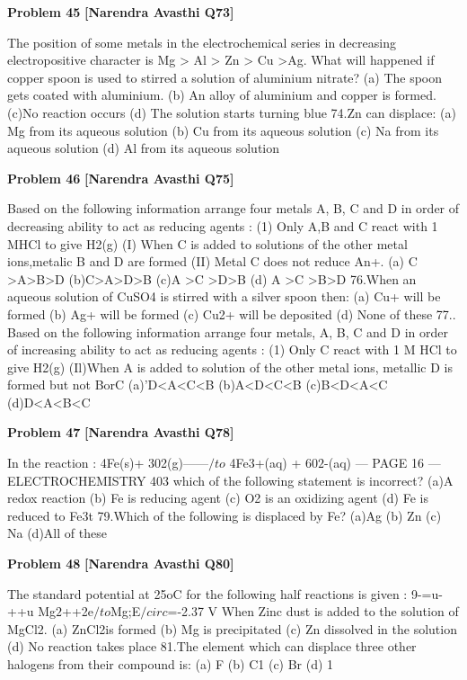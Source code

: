 \begin{problembox}
\textbf{Problem 45} \hfill \textbf{[Narendra Avasthi Q73]}
\label{q:ext-narendra_avasthi_all_questions-45}

The position of some metals in the electrochemical series in decreasing electropositive
character is Mg > Al > Zn > Cu >Ag. What will happened if copper spoon is used to stirred a
solution of aluminium nitrate?
(a) The spoon gets coated with aluminium.
(b) An alloy of aluminium and copper is formed.
(c)No reaction occurs
(d) The solution starts turning blue
74.Zn can displace:
(a) Mg from its aqueous solution
(b) Cu from its aqueous solution
(c) Na from its aqueous solution
(d) Al from its aqueous solution
\end{problembox}

\begin{problembox}
\textbf{Problem 46} \hfill \textbf{[Narendra Avasthi Q75]}
\label{q:ext-narendra_avasthi_all_questions-46}

Based on the following information arrange four metals A, B, C and D in order of decreasing
ability to act as reducing agents :
(1) Only A,B and C react with 1 MHCl to give H2(g)
(I) When C is added to solutions of the other metal ions,metalic B and D are formed
(II) Metal C does not reduce An+.
(a) C >A>B>D
(b)C>A>D>B
(c)A >C >D>B
(d) A >C >B>D
76.When an aqueous solution of CuSO4 is stirred with a silver spoon then:
(a) Cu+ will be formed
(b) Ag+ will be formed
(c) Cu2+ will be deposited
(d) None of these
77.. Based on the following information arrange four metals, A, B, C and D in order of increasing
ability to act as reducing agents :
(1) Only C react with 1 M HCl to give H2(g)
(Il)When A is added to solution of the other metal ions, metallic D is formed but not
BorC
(a)'D<A<C<B
(b)A<D<C<B
(c)B<D<A<C
(d)D<A<B<C
\end{problembox}

\begin{problembox}
\textbf{Problem 47} \hfill \textbf{[Narendra Avasthi Q78]}
\label{q:ext-narendra_avasthi_all_questions-47}

In the reaction :
4Fe(s)+ 302(g)------$/to$ 4Fe3+(aq) + 60$2$-(aq)
--- PAGE 16 ---
ELECTROCHEMISTRY
403
which of the following statement is incorrect?
(a)A redox reaction
(b) Fe is reducing agent
(c) O2 is an oxidizing agent
(d) Fe is reduced to Fe3t
79.Which of the following is displaced by Fe?
(a)Ag
(b) Zn
(c) Na
(d)All of these
\end{problembox}

\begin{problembox}
\textbf{Problem 48} \hfill \textbf{[Narendra Avasthi Q80]}
\label{q:ext-narendra_avasthi_all_questions-48}

The standard potential at 25oC for the following half reactions is given :
9-=u-++u
Mg$2$++2e$/to$Mg;E$/circ$=-2.37 V
When Zinc dust is added to the solution of MgCl2.
(a) ZnCl2is formed
(b) Mg is precipitated
(c) Zn dissolved in the solution
(d) No reaction takes place
81.The element which can displace three other halogens from their compound is:
(a) F
(b) C1
(c) Br
(d) 1
\end{problembox}


